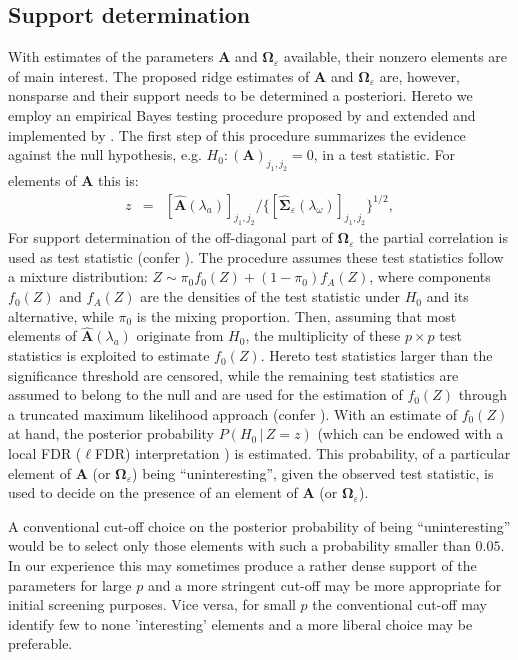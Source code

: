 \subsection{Support determination} \label{sect.supportDetermination}
With estimates of the parameters $\mathbf{A}$ and $\mathbf{\Omega}_{\varepsilon}$ available, their nonzero elements are of main interest. The proposed ridge estimates of $\mathbf{A}$ and $\mathbf{\Omega}_{\varepsilon}$ are, however, nonsparse and their support needs to be determined a posteriori. Hereto we employ an empirical Bayes testing procedure proposed by \cite{Efron2004} and extended and implemented by \cite{Strimmer2008}. The first step of this procedure summarizes the evidence against the null hypothesis, e.g. $H_0 : (\mathbf{A})_{j_1, j_2} =0$, in a test statistic. For elements of $\mathbf{A}$ this is:
\begin{eqnarray*}
z & = & [\hat{\mathbf{A}}(\lambda_a)]_{j_1, j_2} / \{ [\widehat{\mathbf{\Sigma}}_{\varepsilon}(\lambda_{\omega})]_{j_1, j_2} \}^{1/2},
\end{eqnarray*}
For support determination of the off-diagonal part of $\mathbf{\Omega}_{\varepsilon}$ the partial correlation is used as test statistic (confer \cite{Wieringen2016}). The procedure assumes these test statistics follow a mixture distribution:  $Z \sim \pi_0  f_0(Z) + (1-\pi_0) f_A(Z)$, where components $f_0(Z)$ and $f_A(Z)$ are the densities of the test statistic under $H_0$ and its alternative, while $\pi_0$ is the mixing proportion. Then, assuming that most elements of $\hat{\mathbf{A}}(\lambda_a)$ originate from $H_0$, the multiplicity of these $p \times p$ test statistics is exploited to estimate $f_0(Z)$. Hereto test statistics larger than the significance threshold are censored, while the remaining test statistics are assumed to belong to the null and are used for the estimation of $f_0(Z)$ through a truncated maximum likelihood approach (confer \cite{Strimmer2008}). With an estimate of $f_0(Z)$ at hand, the posterior probability $P(H_0 \, | \, Z=z)$ (which can be endowed with a local FDR ($\ell$FDR) interpretation \cite{Efron2004}) is estimated. This probability, of a particular element of $\mathbf{A}$  (or $\mathbf{\Omega}_{\varepsilon}$) being ``uninteresting'', given the observed test statistic, is used to decide on the presence of an element of $\mathbf{A}$ (or $\mathbf{\Omega}_{\varepsilon}$).

A conventional cut-off choice on the posterior probability of being ``uninteresting'' would be to select only those elements with such a probability smaller than $0.05$. In our experience this may sometimes produce a rather dense support of the parameters for large $p$ and a more stringent cut-off may be more appropriate for initial screening purposes. Vice versa, for small $p$ the conventional cut-off may identify few to none 'interesting' elements and a more liberal choice may be preferable.


